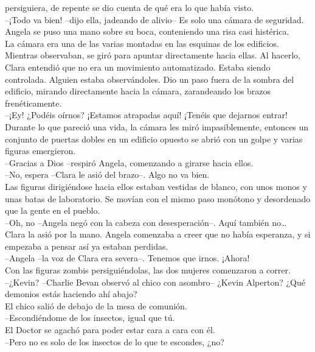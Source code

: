 persiguiera, de repente se dio cuenta de qué era lo que había visto.\\
--¡Todo va bien! --dijo ella, jadeando de alivio-- Es solo una cámara de
seguridad.\\
Angela se puso una mano sobre su boca, conteniendo una risa casi
histérica.\\
La cámara era una de las varias montadas en las esquinas de los
edificios. Mientras observaban, se giró para apuntar directamente hacia
ellas. Al hacerlo, Clara entendió que no era un movimiento automatizado.
Estaba siendo controlada. Alguien estaba observándoles. Dio un paso
fuera de la sombra del edificio, mirando directamente hacia la cámara,
zarandeando los brazos frenéticamente.\\
--¡Ey! ¿Podéis oírnos? ¡Estamos atrapadas aquí! ¡Tenéis que dejarnos
entrar!\\
Durante lo que pareció una vida, la cámara les miró impasiblemente,
entonces un conjunto de puertas dobles en un edificio opuesto se abrió
con un golpe y varias figuras emergieron.\\
--Gracias a Dios --respiró Angela, comenzando a girarse hacia ellos.\\
--No, espera --Clara le asió del brazo--. Algo no va bien.\\
Las figuras dirigiéndose hacia ellos estaban vestidas de blanco, con
unos monos y unas batas de laboratorio. Se movían con el mismo paso
monótono y desordenado que la gente en el pueblo.\\
--Oh, no --Angela negó con la cabeza con desesperación--. Aquí también
no\ldots{}\\
Clara la asió por la mano. Angela comenzaba a creer que no había
esperanza, y si empezaba a pensar así ya estaban perdidas.\\
--Angela --la voz de Clara era severa--. Tenemos que irnos. ¡Ahora!\\
Con las figuras zombis persiguiéndolas, las dos mujeres comenzaron a
correr.\\[2\baselineskip]--¿Kevin? --Charlie Bevan observó al chico con
asombro-- ¿Kevin Alperton? ¿Qué demonios estás haciendo ahí abajo?\\
El chico salió de debajo de la mesa de comunión.\\
--Escondiéndome de los insectos, igual que tú.\\
El Doctor se agachó para poder estar cara a cara con él.\\
--Pero no es solo de los insectos de lo que te escondes, ¿no?\\
